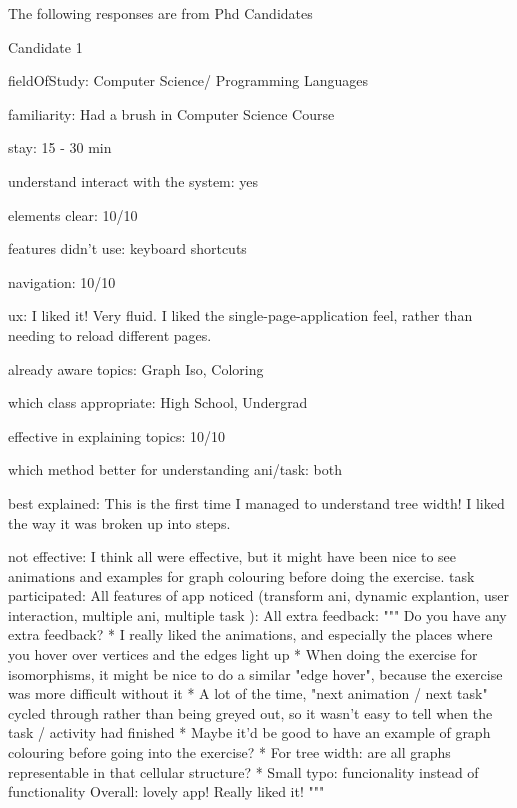 
The following responses are from Phd Candidates


Candidate 1

   fieldOfStudy: Computer Science/ Programming Languages

   familiarity: Had a brush in Computer Science Course

   stay: 15 - 30 min

   understand interact with the system: yes

   elements clear: 10/10

   features didn't use: keyboard shortcuts

   navigation: 10/10

   ux: I liked it! Very fluid. I liked the single-page-application feel, 
       rather than needing to reload different pages. 

   already aware topics: Graph Iso, Coloring

   which class appropriate: High School, Undergrad

   effective in explaining topics: 10/10

   which method better for understanding ani/task: both

   best explained: This is the first time I managed to understand 
                   tree width! I liked the way it was broken up into steps.

   not effective: I think all were effective, but it might have been nice to see animations 
                  and examples for graph colouring before doing the exercise.
   task participated: All
   features of app noticed (transform ani, dynamic explantion, user interaction, multiple ani, multiple task ): All
   extra feedback:
         """
         Do you have any extra feedback?
         * I really liked the animations, and especially the places where you hover 
           over vertices and the edges light up
         * When doing the exercise for isomorphisms, it might be nice to do a similar "edge hover", 
           because the exercise was more difficult without it
         * A lot of the time, "next animation / next task" cycled through rather than being greyed out, 
           so it wasn't easy to tell when the task / activity had finished
         * Maybe it'd be good to have an example of graph colouring before going into the exercise?
         * For tree width: are all graphs representable in that cellular structure?
         * Small typo: funcionality instead of functionality
         Overall: lovely app! Really liked it!
         """



